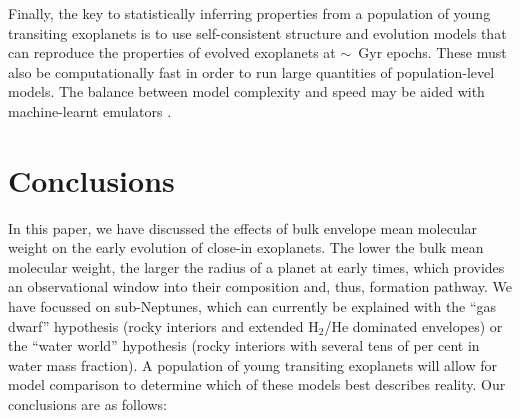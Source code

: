 \documentclass[fleqn,usenatbib]{mnras}
\begin{document}
Finally, the key to statistically inferring properties from a population of young transiting exoplanets is to use self-consistent structure and evolution models that can reproduce the properties of evolved exoplanets at $\sim$~Gyr epochs. These must also be computationally fast in order to run large quantities of population-level models. The balance between model complexity and speed may be aided with machine-learnt emulators \citep{Rogers2023}.

\section{Conclusions} \label{sec:conclusion}
In this paper, we have discussed the effects of bulk envelope mean molecular weight on the early evolution of close-in exoplanets. The lower the bulk mean molecular weight, the larger the radius of a planet at early times, which provides an observational window into their composition and, thus, formation pathway. We have focussed on sub-Neptunes, which can currently be explained with the ``gas dwarf'' hypothesis (rocky interiors and extended H$_2$/He dominated envelopes) or the ``water world'' hypothesis (rocky interiors with several tens of per cent in water mass fraction). A population of young transiting exoplanets will allow for model comparison to determine which of these models best describes reality. Our conclusions are as follows:
\end{document}
